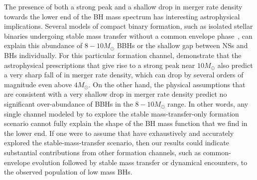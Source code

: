 \documentclass[modern]{aastex631}
\newcommand{\todo}[1]{\textcolor{red}{TODO: #1}}
\begin{document}
The presence of both a strong peak and a shallow drop in merger rate density towards the lower end of the BH mass spectrum has interesting astrophysical implications. Several models of compact binary formation, such as isolated stellar binaries undergoing stable
mass transfer without a common envelope phase~\citep{vanSon:2022myr}, can explain this abundance of $8-10M_{\odot}$ BBHs or the shallow gap between NSs and BHs individually. For this particular formation channel, \cite{vanSon:2022myr} demonstrate that the astrophysical prescriptions that give rise to a strong peak near $10M_{\odot}$ also predict a very sharp fall of in merger rate density, which can drop by several orders of magnitude even above $4M_{\odot}$. On the other hand, the physical assumptions that are consistent with a very shallow drop in merger rate density predict no significant over-abundance of BBHs in the $8-10M_{\odot}$ range. In other words, any single channel modeled by  \cite{vanSon:2022myr} to explore the stable mass-transfer-only formation scenario cannot fully explain the shape of the BH mass function that we find in the lower end. If one were to assume that \cite{vanSon:2022myr} have exhaustively and accurately explored the stable-mass-transfer scenario, then our results could indicate substantial contributions from other formation channels, such as common-envelope evolution followed by stable mass transfer or dynamical encounters, to the observed population of low mass BHs.

\end{document}
